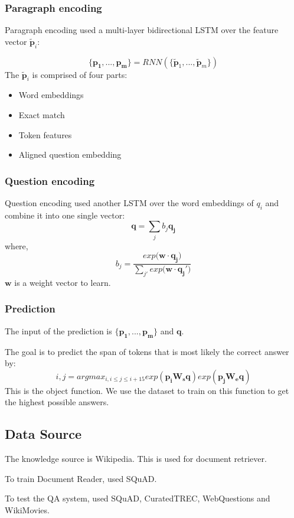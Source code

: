 \documentclass[12pt]{article}
\numberwithin{equation}{section}
\begin{document}
\subsubsection{Paragraph encoding}
	Paragraph encoding used a multi-layer bidirectional LSTM over the feature vector $\widetilde{\bm{p}}_i$: \par
	\begin{equation}
		\{\bm{p_1,...,p_m}\}=RNN(\{\widetilde{\bm{p}}_1,...,\widetilde{\bm{p}}_m \})
	\end{equation}	
	The $\widetilde{\bm{p}}_i$ is comprised of four parts:
	\begin{itemize}
		\item Word embeddings
		\item Exact match
		\item Token features
		\item Aligned question embedding
	\end{itemize}
\subsubsection{Question encoding}
	Question encoding used another LSTM over the word embeddings of $q_i$ and combine it into one single vector:
	\begin{equation}
		\bm{q}=\sum_j b_j\bm{q_j}
	\end{equation}	
where,
	\begin{equation}
		b_j = \frac{exp(\bm{w}\cdot\bm{q_j)}}{\sum_{j'}exp(\bm{w}\cdot\bm{q_j')}}
	\end{equation}
$\bm{w}$ is a weight vector to learn. \par
\subsubsection{Prediction}
	The input of the prediction is $\{\bm{p_1,...,p_m}\}$ and $\bm{q}$. \par
	The goal is to predict the span of tokens that is most likely the correct answer by:
	\begin{equation}
		i,j=argmax_{i,i \le j \le i+15} exp(\bm{p_iW_sq})exp(\bm{p_{j}W_eq})
	\end{equation}	
	This is the object function. We use the dataset to train on this function to get the highest possible answers.
\subsection{Data Source}
	The knowledge source is Wikipedia. This is used for document retriever.\par
	To train Document Reader, used SQuAD. \par
	To test the QA system, used SQuAD, CuratedTREC, WebQuestions and WikiMovies. \par
\end{document}
